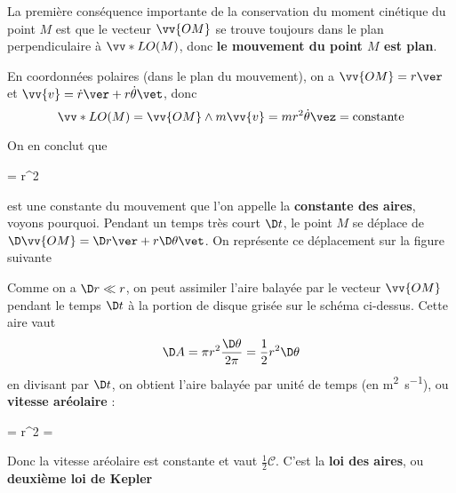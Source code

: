 \documentclass{cours}
\begin{document}
La première conséquence importante de la conservation du moment cinétique du point $M$ est que le vecteur $\vv{OM}$ se trouve toujours dans le plan perpendiculaire à $\vv*{L}{O}(M)$, donc \textbf{le mouvement du point $M$ est plan}.

En coordonnées polaires (dans le plan du mouvement), on a $\vv{OM}=r\ver$ et $\vv{v} = \dot{r}\ver + r \dot{\theta}\vet$, donc 
\begin{equation}
  \vv*{L}{O}(M) = \vv{OM} \wedge m\vv{v} = mr^2\dot{\theta}\vez = \text{constante} 
\end{equation}

On en conclut que 
\begin{eqencadre}
   = r^2 \dot{\theta}  
\end{eqencadre}
est une constante du mouvement que l'on appelle la \textbf{constante des aires}, voyons pourquoi. Pendant un temps très court $\D t$, le point $M$ se déplace de $\D \vv{OM} =  \D r \ver + r\D \theta \vet$. On représente ce déplacement sur la figure suivante
\begin{center}
\end{center}

Comme on a $\D r \ll r$, on peut assimiler l'aire balayée par le vecteur $\vv{OM}$ pendant le temps $\D t$ à la portion de disque grisée sur le schéma ci-dessus. Cette aire vaut
\begin{equation}
  \D A = \pi r^2 \frac{\D \theta}{2 \pi} = \frac{1}{2}r^2 \D\theta
\end{equation}
en divisant par $\D t$, on obtient l'aire balayée par unité de temps (en \si{\square\meter\per\second}), ou \textbf{vitesse aréolaire} :
\begin{eqencadre}
   = r^2 \dot{\theta} = 
\end{eqencadre}
Donc la vitesse aréolaire est constante et vaut $\frac{1}{2}\mathscr{C}$. C'est la \textbf{loi des aires}, ou \textbf{deuxième loi de Kepler} 
\end{document}

